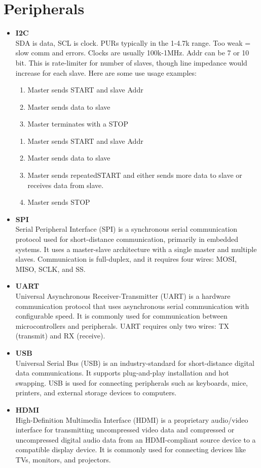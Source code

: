 \documentclass{article}
\begin{document}
\section{Peripherals}
    \begin{itemize}
      \item \textbf{I2C}\\
        SDA is data, SCL is clock. PURs typically in the 1-4.7k range. Too weak = slow comm and errors. Clocks are usually 100k-1MHz. Addr can be 7 or 10 bit. This is rate-limiter for number of slaves, though line impedance would increase for each slave. Here are some use usage examples:
        \begin{enumerate}
          \item Master sends START and slave Addr
          \item Master sends data to slave
          \item Master terminates with a STOP
        \end{enumerate}
        \begin{enumerate}
          \item Master sends START and slave Addr
          \item Master sends data to slave
          \item Master sends repeatedSTART and either sends more data to slave or receives data from slave.
          \item Master sends STOP
        \end{enumerate}
      \item \textbf{SPI}\\
        Serial Peripheral Interface (SPI) is a synchronous serial communication protocol used for short-distance communication, primarily in embedded systems. It uses a master-slave architecture with a single master and multiple slaves. Communication is full-duplex, and it requires four wires: MOSI, MISO, SCLK, and SS.
      \item \textbf{UART}\\
        Universal Asynchronous Receiver-Transmitter (UART) is a hardware communication protocol that uses asynchronous serial communication with configurable speed. It is commonly used for communication between microcontrollers and peripherals. UART requires only two wires: TX (transmit) and RX (receive).
      \item \textbf{USB}\\
        Universal Serial Bus (USB) is an industry-standard for short-distance digital data communications. It supports plug-and-play installation and hot swapping. USB is used for connecting peripherals such as keyboards, mice, printers, and external storage devices to computers.
      \item \textbf{HDMI}\\
        High-Definition Multimedia Interface (HDMI) is a proprietary audio/video interface for transmitting uncompressed video data and compressed or uncompressed digital audio data from an HDMI-compliant source device to a compatible display device. It is commonly used for connecting devices like TVs, monitors, and projectors.
    \end{itemize}
\end{document}
